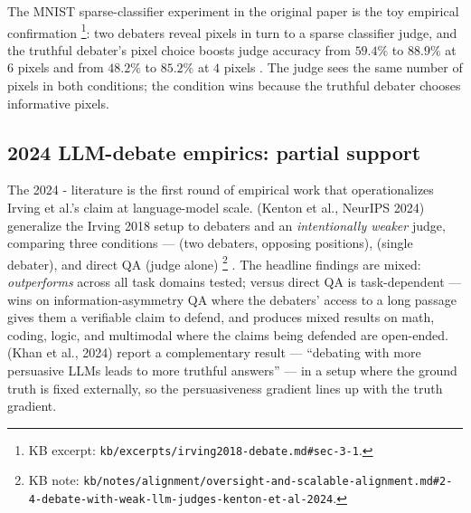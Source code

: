 The MNIST sparse-classifier experiment in the original paper is the
toy empirical confirmation%
\footnote{KB excerpt: \nolinkurl{kb/excerpts/irving2018-debate.md#sec-3-1}.}:
two debaters reveal pixels in turn to a sparse classifier judge,
and the truthful debater's pixel choice boosts judge accuracy from
$59.4\%$ to $88.9\%$ at $6$ pixels and from $48.2\%$ to $85.2\%$ at
$4$ pixels \citep[\S{}abstract,\S 3.1]{irving2018-debate}. The judge
sees the same number of pixels in both conditions; the 
condition wins because the truthful debater chooses informative
pixels.

\subsection{2024 LLM-debate empirics: partial support}
\label{sec:oversight-llm-debate}

The 2024 - literature is the first round of empirical work
that operationalizes Irving et al.'s claim at language-model scale.
\citet{kenton2024-debate-llm-judges} (Kenton et al., NeurIPS 2024)
generalize the Irving 2018 setup to  debaters and an
\emph{intentionally weaker}  judge, comparing three conditions ---
 (two debaters, opposing positions),  (single
debater), and direct QA (judge alone)%
\footnote{KB note: \nolinkurl{kb/notes/alignment/oversight-and-scalable-alignment.md#2-4-debate-with-weak-llm-judges-kenton-et-al-2024}.}
. The headline findings are mixed: 
\emph{outperforms}  across all task domains tested; 
versus direct QA is task-dependent ---  wins on
information-asymmetry QA where the debaters' access to a long passage
gives them a verifiable claim to defend, and produces mixed results on
math, coding, logic, and multimodal where the claims being defended
are open-ended. \citet{khan2024-debating-llms} (Khan et al., 2024)
report a complementary result --- ``debating with more persuasive LLMs
leads to more truthful answers''  --- in a setup where the ground truth
is fixed externally, so the persuasiveness gradient lines up with the
truth gradient.

